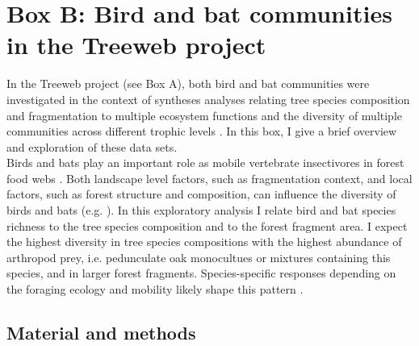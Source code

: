 \documentclass[10pt, twoside]{book} %
\begin{document}
\begin{table}
\begin{center}
\begin{footnotesize}
\begin{tabular}{p{2cm} p{6cm} c l}
					
					
					
					\bottomrule
					
					
					
					
				\end{tabular}\endgroup
			\end{footnotesize}
		\end{center}
	\end{table}
\clearpage


	
	\newpage
	\section*{Box B: Bird and bat communities in the Treeweb project}\label{boxb}
	\vspace{2cm}
	
In the Treeweb project (see Box A), both bird and bat communities were investigated in the context of syntheses analyses relating tree species composition and fragmentation to multiple ecosystem functions and the diversity of multiple communities across different trophic levels \citep{Hertzog2020, Perring2021}. In this box, I give a brief overview and exploration of these data sets.\\

Birds and bats play an important role as mobile vertebrate insectivores in forest food webs \citep{Sekercioglu2012, Russo2016}. Both landscape level factors, such as fragmentation context, and local factors, such as forest structure and composition, can influence the diversity of birds and bats (e.g. \citealt{Charbonnier2016, Fuentes-Montemayor2013, Fuentes-Montemayor2017, Whytock2018, Penone2019, Barbaro2019}). In this exploratory analysis I relate bird and bat species richness to the tree species composition and to the forest fragment area. I expect the highest diversity in tree species compositions with the highest abundance of arthropod prey, i.e. pedunculate oak monocultues or mixtures containing this species, and in larger forest fragments. Species-specific responses depending on the foraging ecology and mobility likely shape this pattern \citep{Fuentes-Montemayor2013, Barbaro2019}.\\

\subsection*{Material and methods}
\end{document}
